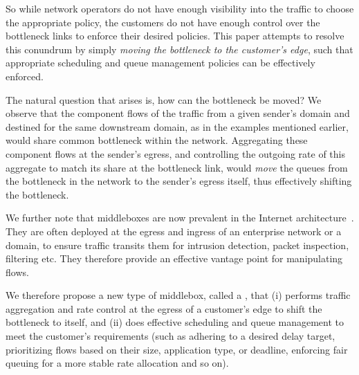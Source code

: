 So while network operators do not have enough visibility into the traffic to choose the appropriate policy, the customers do not have enough control over the bottleneck links to enforce their desired policies. This paper attempts to resolve this conundrum by simply \emph{moving the bottleneck to the customer's edge}, such that appropriate scheduling and queue management policies can be effectively enforced.

The natural question that arises is, how can the bottleneck be moved? We observe that the component flows of the traffic from a given sender's domain and destined for the same downstream domain, as in the examples mentioned earlier, would share common bottleneck within the network. Aggregating these component flows at the sender's egress, and controlling the outgoing rate of this aggregate to match its share at the bottleneck link, would \emph{move} the queues from the bottleneck in the network to the sender's egress itself, thus effectively shifting the bottleneck. 

We further note that middleboxes are now prevalent in the Internet architecture~\cite{aplomb}. They are often deployed at the egress and ingress of an enterprise network or a domain, to ensure traffic transits them for intrusion detection, packet inspection, filtering etc. They therefore provide an effective vantage point for manipulating flows. 

We therefore propose a new type of middlebox, called a \name, that (i) performs traffic aggregation and rate control at the egress of a customer's edge to shift the bottleneck to itself, and (ii) does effective scheduling and queue management to meet the customer's requirements (such as adhering to a desired delay target, prioritizing flows based on their size, application type, or deadline, enforcing fair queuing for a more stable rate allocation and so on).


